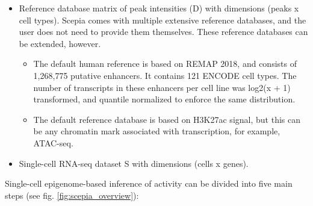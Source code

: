 \begin{itemize}
	\item Reference database matrix of peak intensities (D) with dimensions (peaks x cell types). Scepia comes with multiple extensive reference databases, and the user does not need to provide them themselves. These reference databases can be extended, however.
    \begin{itemize}
        \item The default human reference is based on REMAP 2018\cite{Chneby2017}, and consists of 1,268,775 putative enhancers. It contains 121 ENCODE\cite{encode_dcc} cell types. The number of transcripts in these enhancers per cell line was log2(x + 1) transformed, and quantile normalized\cite{qnorm} to enforce the same distribution.
        \item The default reference database is based on H3K27ac signal, but this can be any chromatin mark associated with transcription, for example, ATAC-seq.
    \end{itemize}
	\item Single-cell RNA-seq dataset S with dimensions (cells x genes). 
\end{itemize}

\noindent
Single-cell epigenome-based inference of activity can be divided into five main steps (see fig. \ref{fig:scepia_overview}):

